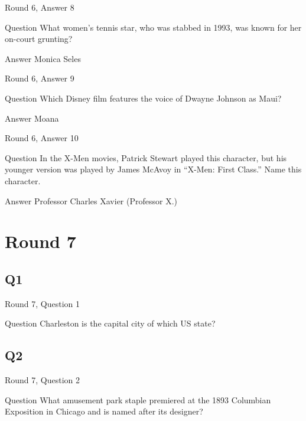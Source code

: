 \documentclass[11pt]{beamer}
\begin{document}
\begin{frame}[t]{Round 6, Answer 8}
\vspace{2em}
\begin{block}{Question}
What women's tennis star, who was stabbed in 1993, was known for her on-court grunting\@?
\end{block}
\pause{}
\begin{block}{Answer}
Monica Seles
\end{block}
\end{frame}
    

\begin{frame}[t]{Round 6, Answer 9}
\vspace{2em}
\begin{block}{Question}
Which Disney film features the voice of Dwayne Johnson as Maui\@?
\end{block}
\pause{}
\begin{block}{Answer}
Moana
\end{block}
\end{frame}
    

\begin{frame}[t]{Round 6, Answer 10}
\vspace{2em}
\begin{block}{Question}
In the X-Men movies, Patrick Stewart played this character, but his younger version was played by James McAvoy in ``X-Men: First Class.'' Name this character.
\end{block}
\pause{}
\begin{block}{Answer}
Professor Charles Xavier (Professor X.)
\end{block}
\end{frame}
    

\section{Round 7}
    

\subsection*{Q1}
\begin{frame}[t]{Round 7, Question 1}
\vspace{2em}
\begin{block}{Question}
Charleston is the capital city of which US state\@?
\end{block}
\end{frame}
    

\subsection*{Q2}
\begin{frame}[t]{Round 7, Question 2}
\vspace{2em}
\begin{block}{Question}
What amusement park staple premiered at the 1893 Columbian Exposition in Chicago and is named after its designer\@?
\end{block}
\end{frame}
    
\end{document}

